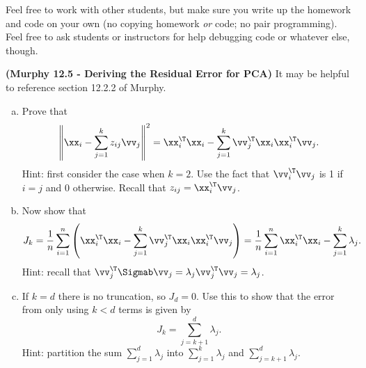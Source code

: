 \documentclass[12pt,letterpaper,fleqn]{hmcpset}
\begin{document}
Feel free to work with other students, but make sure you write up the homework
and code on your own (no copying homework \textit{or} code; no pair programming).
Feel free to ask students or instructors for help debugging code or whatever else,
though.

\begin{problem}[1]
	\textbf{(Murphy 12.5 - Deriving the Residual Error for PCA)} It may be helpful to reference
	section 12.2.2 of Murphy.
	\begin{enumerate}[(a)]
		\item Prove that
		      \[
			      \left\|\xx_i - \sum_{j=1}^k z_{ij}\vv_j\right\|^2 = \xx_i^\T\xx_i - \sum_{j=1}^k\vv_j^\T \xx_i\xx_i^\T \vv_j.
		      \]
		      Hint: first consider the case when $k=2$. Use the fact that $\vv_i^\T\vv_j$ is 1 if $i=j$ and 0 otherwise.
		      Recall that $z_{ij} = \xx_i^\T\vv_j$.

		\item Now show that
		      \[
			      J_k = \frac{1}{n}\sum_{i=1}^n \left(\xx_i^\T \xx_i - \sum_{j=1}^k\vv_j^\T \xx_i\xx_i^\T \vv_j\right) = \frac{1}{n}\sum_{i=1}^n \xx_i^\T\xx_i - \sum_{j=1}^k\lambda_j.
		      \]
		      Hint: recall that $\vv_j^\T \Sigmab \vv_j = \lambda_j\vv_j^\T\vv_j = \lambda_j$.

		\item If $k=d$ there is no truncation, so $J_d=0$. Use this to show that the error from only using $k<d$
		      terms is given by
		      \[
			      J_k = \sum_{j=k+1}^d \lambda_j.
		      \]
		      Hint: partition the sum $\sum_{j=1}^d \lambda_j$ into $\sum_{j=1}^k \lambda_j$ and $\sum_{j=k+1}^d \lambda_j$.
	\end{enumerate}
\end{problem}
\begin{solution}
	\vfill
\end{solution}
\newpage
\end{document}
